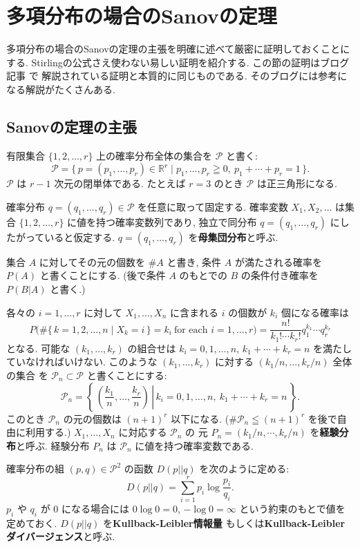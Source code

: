 \documentclass[12pt,twoside]{jarticle}
\newcommand\R{{\mathbb R}} %
\newcommand\cP{{\mathcal P}}
\theoremstyle{jplain}
\theoremstyle{jplain}
\theoremstyle{jplain}
\numberwithin{theorem}{section}
\numberwithin{equation}{section}
\numberwithin{figure}{section}
\numberwithin{table}{section}
\begin{document}
\section{多項分布の場合のSanovの定理}
\label{sec:Sanov}

多項分布の場合のSanovの定理の主張を明確に述べて厳密に証明しておくことにする.
Stirlingの公式さえ使わない易しい証明を紹介する.
この節の証明はブログ記事 \cite{vanRamon2013} で
解説されている証明と本質的に同じものである.
そのブログには参考になる解説がたくさんある.


\subsection{Sanovの定理の主張}


有限集合 $\{1,2,\ldots,r\}$ 上の確率分布全体の集合を $\cP$ と書く:
\[
\cP = \{\,p=(p_1,\ldots,p_r)\in\R^r\mid p_1,\ldots,p_r\geqq 0,\ p_1+\cdots+p_r=1 \,\}.
\]
$\cP$ は $r-1$ 次元の閉単体である.
たとえば $r=3$ のとき $\cP$ は正三角形になる.

確率分布 $q=(q_1,\ldots,q_r)\in\cP$ を任意に取って固定する.
確率変数 $X_1,X_2,\ldots$ は集合 $\{1,2,\ldots,r\}$ に値を持つ確率変数列であり, 
独立で同分布 $q=(q_1,\ldots,q_r)$ にしたがっていると仮定する.
$q=(q_1,\ldots,q_r)$ を{\bf 母集団分布}と呼ぶ.

集合 $A$ に対してその元の個数を $\# A$ と書き, 
条件 $A$ が満たされる確率を $P(A)$ と書くことにする.
(後で条件 $A$ のもとでの $B$ の条件付き確率を $P(B|A)$ と書く.)

各々の $i=1,\ldots,r$ に対して
$X_1,\ldots,X_n$ に含まれる $i$ の個数が $k_i$ 個になる確率は 
\[
P\biggl(
\#\{\,k=1,2,\ldots,n\mid X_k=i\,\}=k_i\ \text{for each $i=1,\ldots,r$}
\biggr)
=
\frac{n!}{k_1!\cdots k_r!}q_1^{k_1}\cdots q_r^{k_r}
\]
となる. 可能な $(k_1,\ldots,k_r)$ の組合せは 
$k_i=0,1,\ldots,n$, $k_1+\cdots+k_r=n$ を満たしていなければいけない.
このような $(k_1,\ldots,k_r)$ に対する $(k_1/n,\ldots,k_r/n)$ 全体の集合
を $\cP_n\subset\cP$ と書くことにする:
\[
\cP_n =
\left\{\left.\,\left(\frac{k_1}{n},\ldots,\frac{k_r}{n}\right)
\,\right|\,
k_i=0,1,\ldots,n,\ k_1+\cdots+k_r=n
\,\right\}.
\]
このとき $\cP_n$ の元の個数は $(n+1)^r$ 以下になる.
($\#\cP_n\leqq(n+1)^r$ を後で自由に利用する.)
$X_1,\ldots,X_n$ に対応する $\cP_n$ の
元 $P_n=(k_1/n,\cdots,k_r/n)$ を{\bf 経験分布}と呼ぶ.
経験分布 $P_n$ は $\cP_n$ に値を持つ確率変数である.

確率分布の組 $(p,q)\in\cP^2$ の函数 $D(p||q)$ を次のように定める:
\[
D(p||q)=\sum_{i=1}^r p_i\log\frac{p_i}{q_i}.
\]
$p_i$ や $q_i$ が $0$ になる場合には $0\log 0=0$, $-\log 0=\infty$ 
という約束のもとで値を定めておく.
$D(p||q)$ を{\bf Kullback-Leibler情報量}
もしくは{\bf Kullback-Leiblerダイバージェンス}と呼ぶ.
\end{document}
